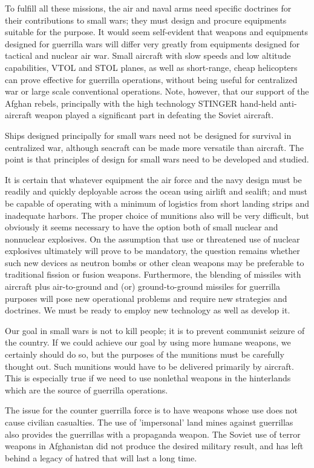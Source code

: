 To fulfill all these missions, the air and naval arms need specific doctrines for their contributions to small wars; they must design and procure equipments suitable for the purpose. It would seem self-evident that weapons and equipments designed for guerrilla wars will differ very greatly from equipments designed for tactical and nuclear air war. Small aircraft with slow speeds and low altitude capabilities, VTOL and STOL planes, as well as short-range, cheap helicopters can prove effective for guerrilla operations, without being useful for centralized war or large scale conventional operations. Note, however, that our support of the Afghan rebels, principally with the high technology STINGER hand-held anti-aircraft weapon played a significant part in defeating the Soviet aircraft.

Ships designed principally for small wars need not be designed for survival in centralized war, although seacraft can be made more versatile than aircraft. The point is that principles of design for small wars need to be developed and studied.

It is certain that whatever equipment the air force and the navy design must be readily and quickly deployable across the ocean using airlift and sealift; and must be capable of operating with a minimum of logistics from short landing strips and inadequate harbors. The proper choice of munitions also will be very difficult, but obviously it seems necessary to have the option both of small nuclear and nonnuclear explosives. On the assumption that use or threatened use of nuclear explosives ultimately will prove to be mandatory, the question remains whether such new devices as neutron bombs or other clean weapons may be preferable to traditional fission or fusion weapons. Furthermore, the blending of missiles with aircraft plus air-to-ground and (or) ground-to-ground missiles for guerrilla purposes will pose new operational problems and require new strategies and doctrines. We must be ready to employ new technology as well as develop it.

Our goal in small wars is not to kill people; it is to prevent communist seizure of the country. If we could achieve our goal by using more humane weapons, we certainly should do so, but the purposes of the munitions must be carefully thought out. Such munitions would have to be delivered primarily by aircraft. This is especially true if we need to use nonlethal weapons in the hinterlands which are the source of guerrilla operations.

The issue for the counter guerrilla force is to have weapons whose use does not cause civilian casualties. The use of 'impersonal' land mines against guerrillas also provides the guerrillas with a propaganda weapon. The Soviet use of terror weapons in Afghanistan did not produce the desired military result, and has left behind a legacy of hatred that will last a long time.

